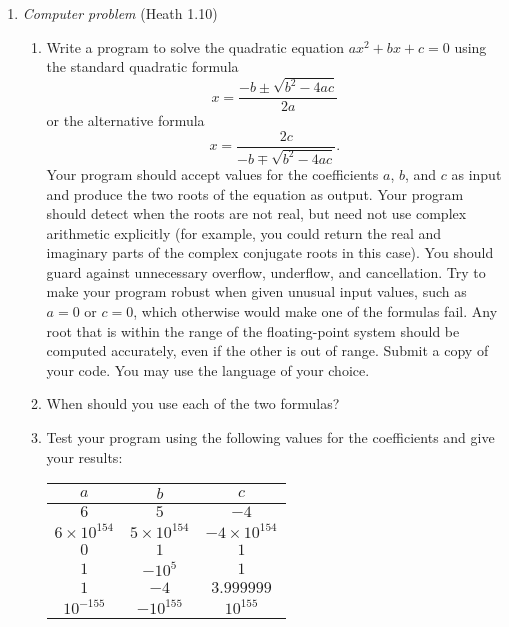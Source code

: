 \documentclass{article}
\begin{document}
\begin{enumerate}
\pagebreak

\item \emph{Computer problem} (Heath 1.10) 
\begin{enumerate}
\item Write a program to solve the quadratic equation $ax^2 + bx+c = 0$ using the standard quadratic formula
$$
x = \frac{-b \pm \sqrt{b^2 - 4ac}}{2a}
$$
or the alternative formula
$$
x = \frac{2c}{-b \mp \sqrt{b^2 - 4ac}}.
$$
Your program should accept values for the coefficients $a$, $b$, and $c$ as input and produce the two roots of the equation as output.  Your program should detect when the roots are not real, but need not use complex arithmetic explicitly (for example, you could return the real and imaginary parts of the complex conjugate roots in this case).  You should guard against unnecessary overflow, underflow, and cancellation.  Try to make your program robust when given unusual input values, such as $a =0$ or $c=0$, which otherwise would make one of the formulas fail.  Any root that is within the range of the floating-point system should be computed accurately, even if the other is out of range.  Submit a copy of your code.  You may use the language of your choice.
\item When should you use each of the two formulas?
\item Test your program using the following values for the coefficients and give your results:

\begin{tabular}{ccc}
$a$ & $b$ & $c$ \\
\hline
$6$ & $5$ & $-4$ \\
$6 \times 10^{154}$ & $5 \times 10^{154}$ & $-4 \times 10^{154}$ \\
$0$ & $1$ & $1$ \\
$1$ & $-10^5$ & $1$ \\
$1$ & $-4$ & $3.999999$ \\
$10^{-155}$ & $-10^{155}$ & $10^{155}$ 
\end{tabular}

\end{enumerate}
\end{enumerate}
\end{document}
